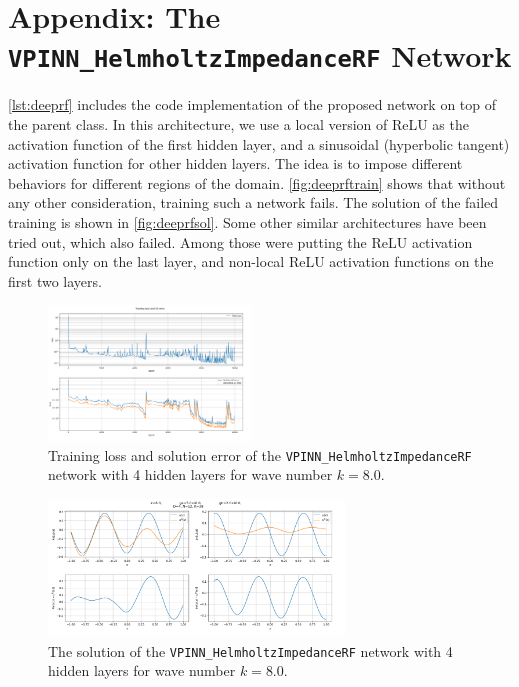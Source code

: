 \appendix

\section{Appendix: The \texttt{VPINN\_HelmholtzImpedanceRF} Network}
\label{app:deeprf}
\autoref{lst:deeprf} includes the code implementation of the proposed network on top of the parent class. In this architecture, we use a local version of ReLU as the activation function of the first hidden layer, and a sinusoidal (hyperbolic tangent) activation function for other hidden layers. The idea is to impose different behaviors for different regions of the domain. \autoref{fig:deeprftrain} shows that without any other consideration, training such a network fails. The solution of the failed training is shown in \autoref{fig:deeprfsol}. Some other similar architectures have been tried out, which also failed. Among those were putting the ReLU activation function only on the last layer, and non-local ReLU activation functions on the first two layers.

\begin{figure}[h!]
    \centering
    \includegraphics[width = 0.48\textwidth]{img/DeepRF-D004N012K038-training.png}
    \caption{Training loss and solution error of the \texttt{VPINN\_HelmholtzImpedanceRF} network with 4 hidden layers for wave number $k=8.0$.}
    \label{fig:deeprftrain}
\end{figure}

\begin{figure}[h!]
    \centering
    \includegraphics[width = 0.7\textwidth]{img/DeepRF-D004N012K038-sol.png}
    \caption{The solution of the \texttt{VPINN\_HelmholtzImpedanceRF} network with 4 hidden layers for wave number $k=8.0$.}
    \label{fig:deeprfsol}
\end{figure}


